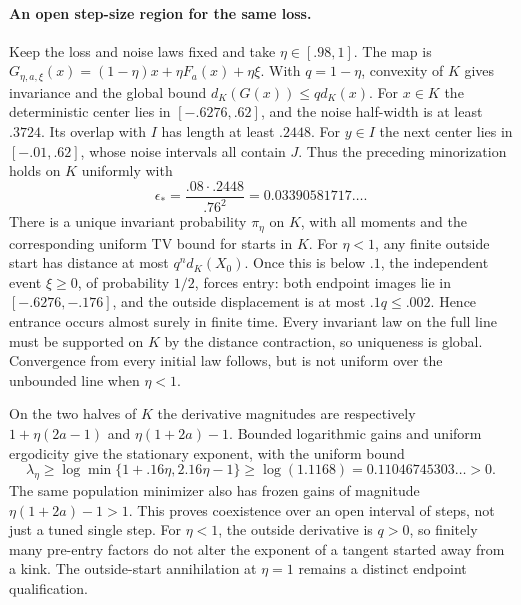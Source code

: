 \paragraph{An open step-size region for the same loss.}
Keep the loss and noise laws fixed and take $\eta\in[.98,1]$. The map is
$G_{\eta,a,\xi}(x)=(1-\eta)x+\eta F_a(x)+\eta\xi$.
With $q=1-\eta$, convexity of $K$ gives invariance and the global bound
$d_K(G(x))\le qd_K(x)$. For $x\in K$ the deterministic center lies in
$[-.6276,.62]$, and the noise half-width is at least $.3724$.
Its overlap with $I$ has length at least $.2448$. For $y\in I$ the next
center lies in $[-.01,.62]$, whose noise intervals all contain $J$.
Thus the preceding minorization holds on $K$ uniformly with
\[
\epsilon_* =\frac{.08\cdot.2448}{.76^2}
=0.03390581717\ldots.
\]
There is a unique invariant probability $\pi_\eta$ on $K$, with all
moments and the corresponding uniform TV bound for starts in $K$.
For $\eta<1$, any finite outside start has distance at most
$q^n d_K(X_0)$. Once this is below $.1$, the independent event
$\xi\ge0$, of probability $1/2$, forces entry: both endpoint images
lie in $[-.6276,-.176]$, and the outside displacement is at most
$.1q\le.002$. Hence entrance occurs almost surely in finite time.
Every invariant law on the full line must be supported on $K$ by the
distance contraction, so uniqueness is global. Convergence from every
initial law follows, but is not uniform over the unbounded line when
$\eta<1$.

On the two halves of $K$ the derivative magnitudes are respectively
$1+\eta(2a-1)$ and $\eta(1+2a)-1$. Bounded logarithmic gains and
uniform ergodicity give the stationary exponent, with the uniform bound
\[
\lambda_\eta\ge\log\min\{1+.16\eta,2.16\eta-1\}
\ge\log(1.1168)=0.11046745303\ldots>0.
\]
The same population minimizer also has frozen gains of magnitude
$\eta(1+2a)-1>1$. This proves coexistence over an open interval of steps,
not just a tuned single step. For $\eta<1$, the outside derivative is
$q>0$, so finitely many pre-entry factors do not alter the exponent of
a tangent started away from a kink. The outside-start annihilation at
$\eta=1$ remains a distinct endpoint qualification.

